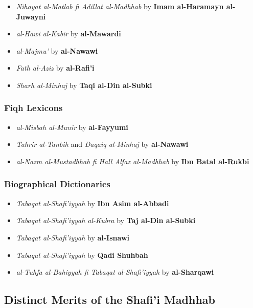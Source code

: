 \documentclass[
  a4paper,
  DIV=11,
  numbers=noendperiod]{scrartcl}
\providecommand{\tightlist}{%
  \setlength{\itemsep}{0pt}\setlength{\parskip}{0pt}}
\begin{document}
\begin{itemize}
\tightlist
\item
  \emph{Nihayat al-Matlab fi Adillat al-Madhhab} by \textbf{Imam
  al-Haramayn al-Juwayni}
\item
  \emph{al-Hawi al-Kabir} by \textbf{al-Mawardi}
\item
  \emph{al-Majmu'} by \textbf{al-Nawawi}
\item
  \emph{Fath al-Aziz} by \textbf{al-Rafi'i}
\item
  \emph{Sharh al-Minhaj} by \textbf{Taqi al-Din al-Subki}
\end{itemize}

\subsubsection{Fiqh Lexicons}\label{fiqh-lexicons}

\begin{itemize}
\tightlist
\item
  \emph{al-Misbah al-Munir} by \textbf{al-Fayyumi}
\item
  \emph{Tahrir al-Tanbih} and \emph{Daqaiq al-Minhaj} by
  \textbf{al-Nawawi}
\item
  \emph{al-Nazm al-Mustadhhab fi Hall Alfaz al-Madhhab} by \textbf{Ibn
  Batal al-Rukbi}
\end{itemize}

\subsubsection{Biographical
Dictionaries}\label{biographical-dictionaries}

\begin{itemize}
\tightlist
\item
  \emph{Tabaqat al-Shafi'iyyah} by \textbf{Ibn Asim al-Abbadi}
\item
  \emph{Tabaqat al-Shafi'iyyah al-Kubra} by \textbf{Taj al-Din al-Subki}
\item
  \emph{Tabaqat al-Shafi'iyyah} by \textbf{al-Isnawi}
\item
  \emph{Tabaqat al-Shafi'iyyah} by \textbf{Qadi Shuhbah}
\item
  \emph{al-Tuhfa al-Bahiyyah fi Tabaqat al-Shafi'iyyah} by
  \textbf{al-Sharqawi}
\end{itemize}

\subsection{Distinct Merits of the Shafi'i
Madhhab}\label{distinct-merits-of-the-shafii-madhhab}
\end{document}
